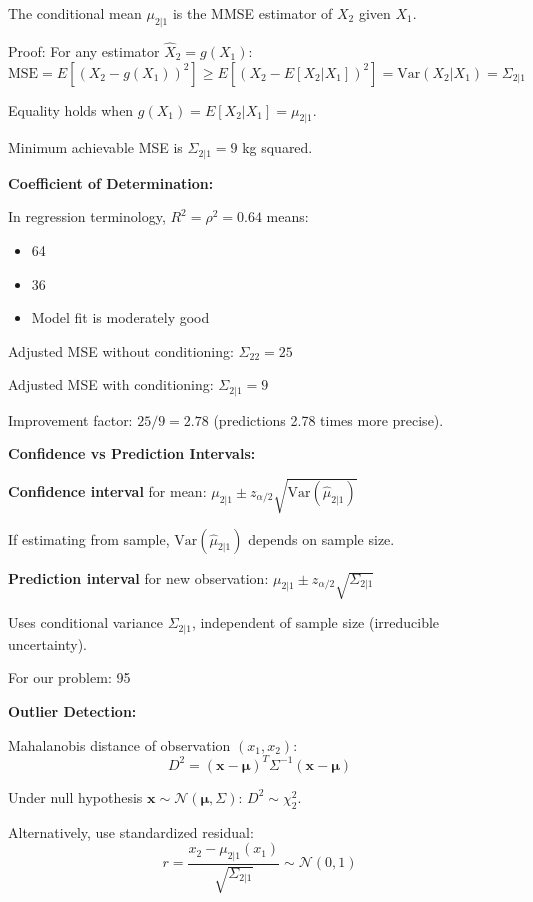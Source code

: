 \documentclass[12pt]{article}
\begin{document}
\begin{explanation}
The conditional mean $\mu_{2|1}$ is the MMSE estimator of $X_2$ given $X_1$.

Proof: For any estimator $\hat{X}_2 = g(X_1)$:
\[
\text{MSE} = E[(X_2 - g(X_1))^2] \geq E[(X_2 - E[X_2|X_1])^2] = \text{Var}(X_2 | X_1) = \Sigma_{2|1}
\]

Equality holds when $g(X_1) = E[X_2|X_1] = \mu_{2|1}$.

Minimum achievable MSE is $\Sigma_{2|1} = 9$ kg squared.

\textbf{Coefficient of Determination:}

In regression terminology, $R^2 = \rho^2 = 0.64$ means:
\begin{itemize}
    \item 64%
    \item 36%
    \item Model fit is moderately good
\end{itemize}

Adjusted MSE without conditioning: $\Sigma_{22} = 25$

Adjusted MSE with conditioning: $\Sigma_{2|1} = 9$

Improvement factor: $25/9 = 2.78$ (predictions 2.78 times more precise).

\textbf{Confidence vs Prediction Intervals:}

\textbf{Confidence interval} for mean: $\mu_{2|1} \pm z_{\alpha/2}\sqrt{\text{Var}(\hat{\mu}_{2|1})}$

If estimating from sample, $\text{Var}(\hat{\mu}_{2|1})$ depends on sample size.

\textbf{Prediction interval} for new observation: $\mu_{2|1} \pm z_{\alpha/2}\sqrt{\Sigma_{2|1}}$

Uses conditional variance $\Sigma_{2|1}$, independent of sample size (irreducible uncertainty).

For our problem: 95%

\textbf{Outlier Detection:}

Mahalanobis distance of observation $(x_1, x_2)$:
\[
D^2 = (\mathbf{x} - \boldsymbol{\mu})^T\Sigma^{-1}(\mathbf{x} - \boldsymbol{\mu})
\]

Under null hypothesis $\mathbf{x} \sim \mathcal{N}(\boldsymbol{\mu}, \Sigma)$: $D^2 \sim \chi^2_2$.

Alternatively, use standardized residual:
\[
r = \frac{x_2 - \mu_{2|1}(x_1)}{\sqrt{\Sigma_{2|1}}} \sim \mathcal{N}(0, 1)
\]


\end{explanation}
\end{document}
